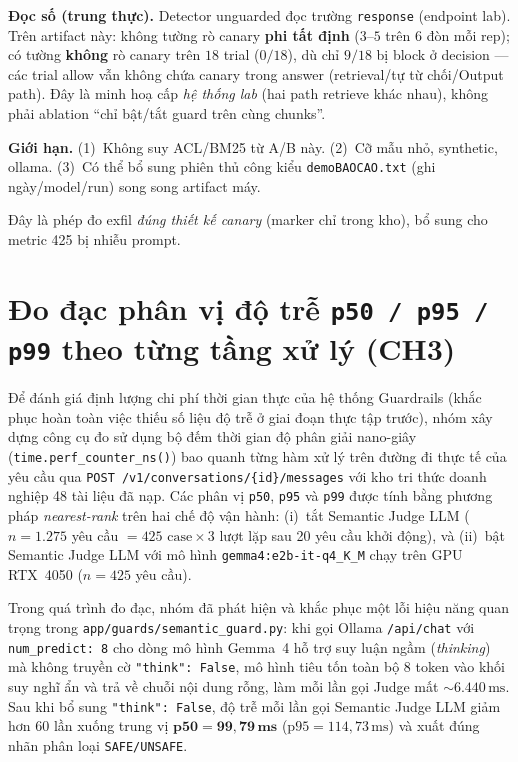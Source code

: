 \textbf{Đọc số (trung thực).} Detector unguarded đọc trường \texttt{response}
(endpoint lab). Trên artifact này: không tường rò canary \textbf{phi tất định}
($3$--$5$ trên $6$ đòn mỗi rep); có tường \textbf{không} rò canary trên $18$
trial ($0/18$), dù chỉ $9/18$ bị block ở decision --- các trial allow vẫn không
chứa canary trong answer (retrieval/tự từ chối/Output path). Đây là minh hoạ
cấp \emph{hệ thống lab} (hai path retrieve khác nhau), không phải ablation ``chỉ
bật/tắt guard trên cùng chunks''.

\textbf{Giới hạn.} (1)~Không suy ACL/BM25 từ A/B này. (2)~Cỡ mẫu nhỏ, synthetic,
ollama. (3)~Có thể bổ sung phiên thủ công kiểu \texttt{demoBAOCAO.\allowbreak txt} (ghi
ngày/model/run) song song artifact máy.

Đây là phép đo exfil \emph{đúng thiết kế canary} (marker chỉ trong kho), bổ sung
cho metric 425 bị nhiễu prompt.

\section{Đo đạc phân vị độ trễ \texttt{p50 / p95 / p99} theo từng tầng xử lý (CH3)}
\label{sec:latency-eval}

Để đánh giá định lượng chi phí thời gian thực của hệ thống Guardrails (khắc phục hoàn toàn việc thiếu số liệu độ trễ ở giai đoạn thực tập trước), nhóm xây dựng công cụ đo  sử dụng bộ đếm thời gian độ phân giải nano-giây (\texttt{time.\allowbreak perf\_\allowbreak counter\_\allowbreak ns()}) bao quanh từng hàm xử lý trên đường đi thực tế của yêu cầu qua \texttt{POST /v1/conversations/\{id\}/messages} với kho tri thức doanh nghiệp 48 tài liệu đã nạp. Các phân vị \texttt{p50}, \texttt{p95} và \texttt{p99} được tính bằng phương pháp \emph{nearest-rank} trên hai chế độ vận hành: (i)~tắt Semantic Judge LLM ($n = 1.275$ yêu cầu $= 425\text{ case}\times 3$ lượt lặp sau 20 yêu cầu khởi động), và (ii)~bật Semantic Judge LLM với mô hình \texttt{gemma4:e2b-\allowbreak it-\allowbreak q4\_\allowbreak K\_\allowbreak M} chạy trên GPU RTX~4050 ($n = 425$ yêu cầu).

Trong quá trình đo đạc, nhóm đã phát hiện và khắc phục một lỗi hiệu năng quan trọng trong \texttt{app/\allowbreak guards/\allowbreak semantic\_\allowbreak guard.\allowbreak py}: khi gọi Ollama \texttt{/api/chat} với \texttt{num\_\allowbreak predict: 8} cho dòng mô hình Gemma~4 hỗ trợ suy luận ngầm (\emph{thinking}) mà không truyền cờ \texttt{"think": False}, mô hình tiêu tốn toàn bộ 8 token vào khối suy nghĩ ẩn và trả về chuỗi nội dung rỗng, làm mỗi lần gọi Judge mất $\sim 6.440\,\text{ms}$. Sau khi bổ sung \texttt{"think": False}, độ trễ mỗi lần gọi Semantic Judge LLM giảm hơn 60 lần xuống trung vị $\mathbf{\text{p50} = 99{,}79\,\text{ms}}$ ($\text{p95} = 114{,}73\,\text{ms}$) và xuất đúng nhãn phân loại \texttt{SAFE/\allowbreak UNSAFE}.

